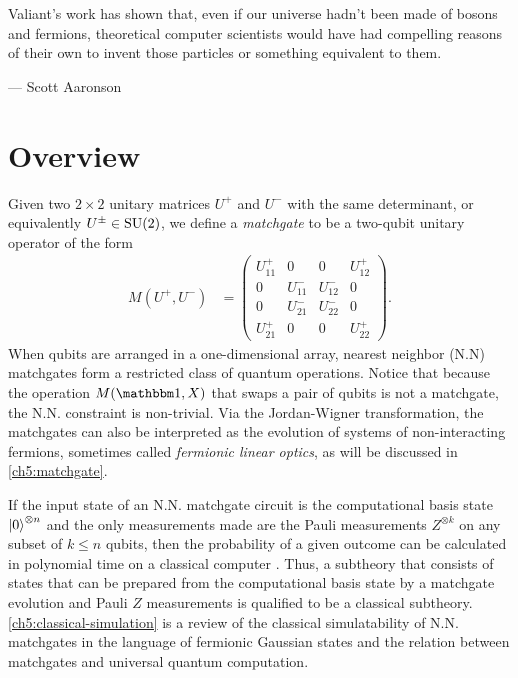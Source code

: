 \newcommand\rep{U}
\setlength\epigraphwidth{8.5cm}
\epigraph{Valiant's work has shown that, even if our universe hadn't been made of bosons and fermions, theoretical computer scientists would have had compelling reasons of their own to invent those particles or something equivalent to them.}{--- \textup{Scott Aaronson}}

\section{Overview}

Given two $2 \times 2$ unitary matrices $U^+$ and $U^-$ with the same determinant, or equivalently $U^{\pm} \in \text{SU}(2)$, we define a \emph{matchgate} to be a two-qubit unitary operator of the form
\begin{align}\label{def:matchgate}
M(U^+,U^-) &=
\begin{pmatrix}
U^+_{11} & 0 & 0 & U^+_{12} \\
0 & U^-_{11} & U^-_{12} & 0 \\
0 & U^-_{21} & U^-_{22} & 0 \\
U^+_{21} & 0 & 0 & U^+_{22}
\end{pmatrix}.
\end{align}
When qubits are arranged in a one-dimensional array, nearest neighbor (N.N) matchgates form a restricted class of quantum operations.  Notice that because the operation $M(\id,X)$ that swaps a pair of qubits is not a matchgate, the N.N. constraint is non-trivial.  Via the Jordan-Wigner transformation, the matchgates can also be interpreted as the evolution of systems of non-interacting fermions, sometimes called \emph{fermionic linear optics}, as will be discussed in \autoref{ch5:matchgate}.

If the input state of an N.N. matchgate circuit is the computational basis state ${\left\vert{0}\right\rangle}^{\otimes n}$ and the only measurements made are the Pauli measurements $Z^{\otimes k}$ on any subset of $k\le n$ qubits, then the probability of a given outcome can be calculated in polynomial time on a classical computer \cite{valiant_quantum_2002}. Thus, a subtheory that consists of states that can be prepared from the computational basis state by a matchgate evolution and Pauli $Z$ measurements is qualified to be a classical subtheory. \autoref{ch5:classical-simulation} is a review of the classical simulatability of N.N. matchgates in the language of fermionic Gaussian states and the relation between matchgates and universal quantum computation.

